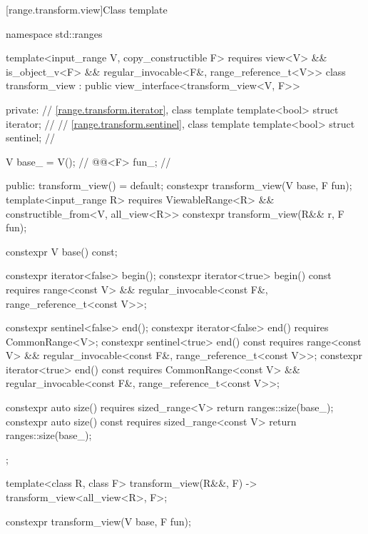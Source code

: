 [range.transform.view]{Class template }

\begin{codeblock}
namespace std::ranges {
  template<input_range V, copy_constructible F>
    requires view<V> && is_object_v<F> &&
             regular_invocable<F&, range_reference_t<V>>
  class transform_view : public view_interface<transform_view<V, F>> {
  private:
    // \ref{range.transform.iterator}, class template 
    template<bool> struct iterator;             // \expos
    // \ref{range.transform.sentinel}, class template 
    template<bool> struct sentinel;             // \expos

    V base_ = V();                              // \expos
    @@<F> fun_;                    // \expos

  public:
    transform_view() = default;
    constexpr transform_view(V base, F fun);
    template<input_range R>
      requires ViewableRange<R> && constructible_from<V, all_view<R>>
    constexpr transform_view(R&& r, F fun);

    constexpr V base() const;

    constexpr iterator<false> begin();
    constexpr iterator<true> begin() const
      requires range<const V> &&
               regular_invocable<const F&, range_reference_t<const V>>;

    constexpr sentinel<false> end();
    constexpr iterator<false> end() requires CommonRange<V>;
    constexpr sentinel<true> end() const
      requires range<const V> &&
               regular_invocable<const F&, range_reference_t<const V>>;
    constexpr iterator<true> end() const
      requires CommonRange<const V> &&
               regular_invocable<const F&, range_reference_t<const V>>;

    constexpr auto size() requires sized_range<V> { return ranges::size(base_); }
    constexpr auto size() const requires sized_range<const V>
    { return ranges::size(base_); }
  };

  template<class R, class F>
    transform_view(R&&, F) -> transform_view<all_view<R>, F>;
}
\end{codeblock}

%
\begin{itemdecl}
constexpr transform_view(V base, F fun);
\end{itemdecl}


